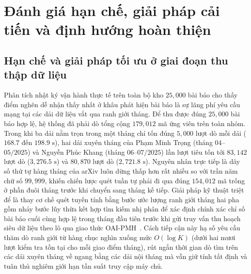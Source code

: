 \section{Đánh giá hạn chế, giải pháp cải tiến và định hướng hoàn thiện}

\subsection{Hạn chế và giải pháp tối ưu ở giai đoạn thu thập dữ liệu}

Phân tích nhật ký vận hành thực tế trên toàn bộ kho $25{,}000$ bài báo cho thấy điểm nghẽn dễ nhận thấy nhất ở khâu phát hiện bài báo là sự lãng phí yêu cầu mạng tại các dải dữ liệu vắt qua ranh giới tháng. Để thu được đúng $25{,}000$ bài báo hợp lệ, hệ thống đã phải dò tổng cộng $179{,}012$ mã ứng viên trên toàn nhóm. Trong khi ba dải nằm trọn trong một tháng chỉ tốn đúng $5{,}000$ lượt dò mỗi dải ($168.7$ đến $198.9\text{ s}$), hai dải xuyên tháng của Phạm Minh Trọng (tháng $04$--$05/2025$) và Nguyễn Phúc Khang (tháng $06$--$07/2025$) lần lượt tiêu tốn tới $83{,}142$ lượt dò ($3{,}276.5\text{ s}$) và $80{,}870$ lượt dò ($2{,}721.8\text{ s}$). Nguyên nhân trực tiếp là dãy số thứ tự hàng tháng của arXiv luôn dừng thấp hơn rất nhiều so với trần năm chữ số $99{,}999$, khiến chiến lược quét tuần tự phải đi qua đúng $154{,}012$ mã trống ở phần đuôi tháng trước khi chuyển sang tháng kế tiếp. Giải pháp kỹ thuật triệt để là thay cơ chế quét tuyến tính bằng bước ước lượng ranh giới tháng hai pha gồm nhảy bước lũy thừa kết hợp tìm kiếm nhị phân để xác định chính xác chỉ số bài báo cuối cùng hợp lệ trong tháng đầu tiên trước khi gửi truy vấn thu hoạch siêu dữ liệu theo lô qua giao thức OAI-PMH~\cite{arxiv_api,arxiv_oai_2025}. Cách tiếp cận này hạ số yêu cầu thăm dò ranh giới từ hàng chục nghìn xuống mức $O(\log K)$ (dưới hai mươi lượt kiểm tra tồn tại cho mỗi giao điểm tháng), rút ngắn thời gian dò tìm trên các dải xuyên tháng về ngang bằng các dải nội tháng mà vẫn giữ tính tất định và tuân thủ nghiêm giới hạn tần suất truy cập máy chủ.

